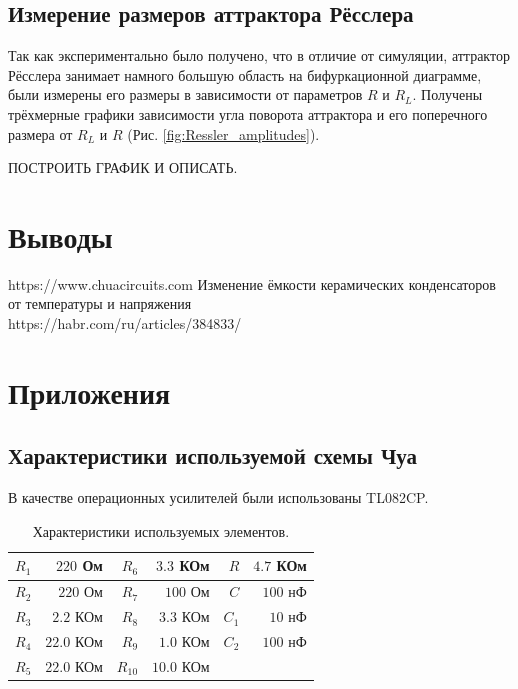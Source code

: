 \documentclass[12pt]{article}
\begin{document}
\subsection*{Измерение размеров аттрактора Рёсслера}
Так как экспериментально было получено, что в отличие от симуляции, аттрактор 
Рёсслера занимает намного большую область на бифуркационной диаграмме, были измерены 
его размеры в зависимости от параметров $R$ и $R_L$. Получены трёхмерные графики зависимости угла поворота аттрактора и 
его поперечного размера от $R_L$ и $R$ (Рис. \ref{fig:Ressler_amplitudes}).

ПОСТРОИТЬ ГРАФИК И ОПИСАТЬ. 


\section*{Выводы}

\begin{thebibliography}{9}
	https://www.chuacircuits.com
	Изменение ёмкости керамических конденсаторов от температуры и напряжения \\ https://habr.com/ru/articles/384833/
\end{thebibliography}

\section*{Приложения}
\subsection*{Характеристики используемой схемы Чуа}
В качестве операционных усилителей были использованы TL082CP.
\begin{table}[H]
	\centering
	\begin{tabular}{|r|r|r|r|r|r|}
		\hline
		$R_1$ & $220$ Ом   & $R_6$  & $3.3$ КОм  & $R$   & $4.7$ КОм \\ \hline
		$R_2$ & $220$ Ом   & $R_7$  & $100$ Ом   & $C$   & $100$ нФ  \\ \hline
		$R_3$ & $2.2$ КОм  & $R_8$  & $3.3$ КОм  & $C_1$ & $10$ нФ   \\ \hline
		$R_4$ & $22.0$ КОм & $R_9$  & $1.0$ КОм  & $C_2$ & $100$ нФ  \\ \hline
		$R_5$ & $22.0$ КОм & $R_{10}$ & $10.0$ КОм &       &           \\ \hline
	\end{tabular}
	\caption{Характеристики используемых элементов.}
	\label{tab:curcuit_chars}
\end{table}
\end{document}
